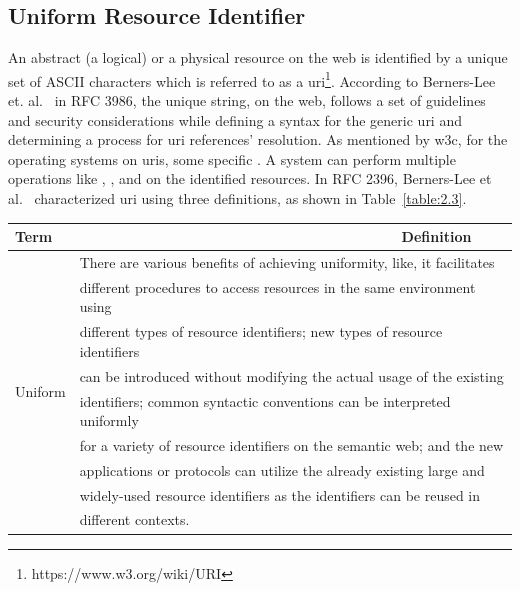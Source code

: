 \begin{doublespace}
\subsection{Uniform Resource Identifier} \label{subsection:uri}
\par An abstract (a logical) or a physical resource on the web is identified by a unique set of ASCII characters which is referred to as a \ac{uri}\footnote{https://www.w3.org/wiki/URI}. According to Berners-Lee et. al.~\cite{berners1998uri} in RFC 3986, the unique string, on the web, follows a set of guidelines and security considerations while defining a syntax for the generic \ac{uri} and determining a process for \ac{uri} references' resolution. As mentioned by \ac{w3c}, for the operating systems on \ac{uri}s, some specific . A system can perform multiple operations like , ,  and  on the identified resources. In RFC 2396, Berners-Lee et al.~\cite{fielding1998uri} characterized \ac{uri} using three definitions, as shown in Table~\ref{table:2.3}.
\begin{table}[h!]
\centering
\begin{tabular}{| l | l |} 
 \hline
 Term & \ \ \ \ \ \ \ \ \ \ \ \ \ \ \ \ \ \ \ \ \ \ \ \ \ \ \ \ \ \ \ \ \ \ \ \ \ \ \ \ Definition  \\ 
 \hline
  \multirow{9}{4em}{Uniform} & There are various benefits of achieving uniformity, like, it facilitates\\ & different procedures to access resources in the same environment using\\ & different types of resource identifiers; new types of resource identifiers\\ & can be introduced without modifying the actual usage of the existing\\ & identifiers; common syntactic conventions can be interpreted uniformly\\ & for a variety of resource identifiers on the semantic web; and the new\\ & applications or protocols can utilize the already existing large and\\ & widely-used resource identifiers as the identifiers can be reused in\\ & different contexts. \\ \hline

\end{tabular}
\end{table}
\end{doublespace}
